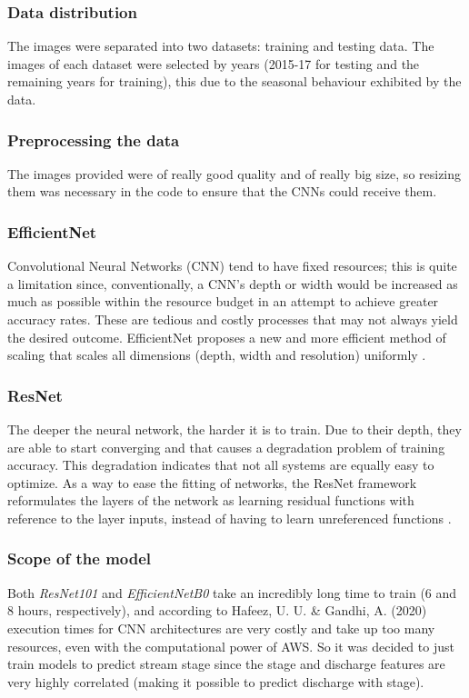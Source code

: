 \documentclass[conference]{IEEEtran}
\begin{document}
\subsubsection{Data distribution}
The images were separated into two datasets: training and testing data. The images of each dataset were selected by years (2015-17 for testing and the remaining years for training), this due to the seasonal behaviour exhibited by the data.
\subsubsection{Preprocessing the data}
The images provided were of really good quality and of really big size, so resizing them was necessary in the code to ensure that the CNNs could receive them.
\subsubsection{EfficientNet}
Convolutional Neural Networks (CNN) tend to have fixed resources; this is quite a limitation since, conventionally, a CNN's depth or width would be increased as much as possible within the resource budget in an attempt to achieve greater accuracy rates. These are tedious and costly processes that may not always yield the desired outcome. EfficientNet proposes a new and more efficient method of scaling that scales all dimensions (depth, width and resolution) uniformly \cite{efficient-net}.
\subsubsection{ResNet}
The deeper the neural network, the harder it is to train. Due to their depth, they are able to start converging and that causes a degradation problem of training accuracy. This degradation indicates that not all systems are equally easy to optimize. As a way to ease the fitting of networks, the ResNet framework reformulates the layers of the network as learning residual functions with reference to the layer inputs, instead of having to learn unreferenced functions \cite{res-net}.
\subsubsection{Scope of the model}
Both \textit{ResNet101} and \textit{EfficientNetB0} take an incredibly long time to train (6 and 8 hours, respectively), and according to Hafeez, U. U. \& Gandhi, A. (2020) \cite{compute-times} execution times for CNN architectures are very costly and take up too many resources, even with the computational power of AWS. So it was decided to just train models to predict stream stage since the stage and discharge features are very highly correlated (making it possible to predict discharge with stage).
\end{document}
